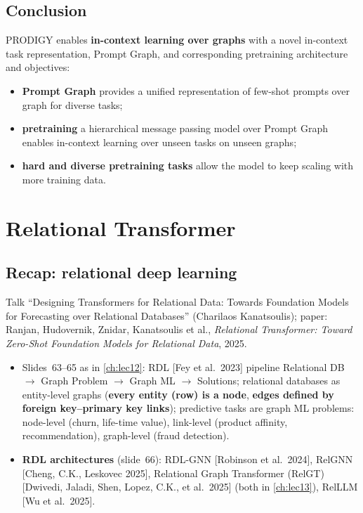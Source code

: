 \subsection{Conclusion}\label{sec:lec14-prodigy-concl}

PRODIGY enables \textbf{in-context learning over graphs} with a novel in-context task
representation, Prompt Graph, and corresponding pretraining architecture and objectives:
\begin{itemize}
  \item \textbf{Prompt Graph} provides a unified representation of few-shot prompts over
    graph for diverse tasks;
  \item \textbf{pretraining} a hierarchical message passing model over Prompt Graph enables
    in-context learning over unseen tasks on unseen graphs;
  \item \textbf{hard and diverse pretraining tasks} allow the model to keep scaling with
    more training data.
\end{itemize}

\section{Relational Transformer}\label{sec:lec14-rt}

\subsection{Recap: relational deep learning}\label{sec:lec14-rdl}

Talk ``Designing Transformers for Relational Data: Towards Foundation Models for
Forecasting over Relational Databases'' (Charilaos Kanatsoulis); paper: Ranjan, Hudovernik,
Znidar, Kanatsoulis et al., \emph{Relational Transformer: Toward Zero-Shot Foundation
Models for Relational Data}, 2025.
\begin{itemize}
  \item Slides~63--65 as in \cref{ch:lec12}: RDL [Fey et al.\ 2023] pipeline Relational DB
    $\to$ Graph Problem $\to$ Graph ML $\to$ Solutions; relational databases as
    entity-level graphs (\textbf{every entity (row) is a node}, \textbf{edges defined by
    foreign key--primary key links}); predictive tasks are graph ML problems: node-level
    (churn, life-time value), link-level (product affinity, recommendation), graph-level
    (fraud detection).
  \item \textbf{RDL architectures} (slide~66): RDL-GNN [Robinson et al.\ 2024], RelGNN
    [Cheng, C.K., Leskovec 2025], Relational Graph Transformer (RelGT) [Dwivedi, Jaladi,
    Shen, Lopez, C.K., et al.\ 2025] (both in \cref{ch:lec13}), RelLLM [Wu et al.\ 2025].
\end{itemize}

